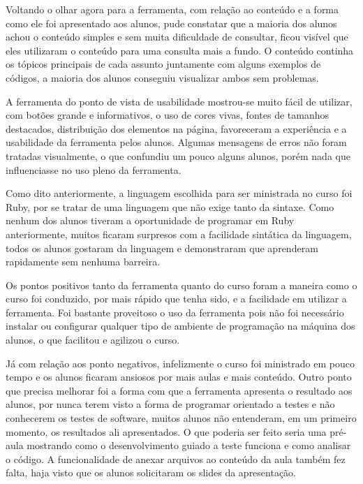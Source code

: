 \documentclass[pnumabnt,normaltoc,espacoumemeio,capchap]{abnt}
\begin{document}
\par Voltando o olhar agora para a ferramenta, com relação ao conteúdo e a forma como ele foi apresentado aos alunos, pude constatar que a maioria dos alunos achou o conteúdo simples e sem muita dificuldade de consultar, ficou visível que eles utilizaram o conteúdo para uma consulta mais a fundo. O conteúdo continha os tópicos principais de cada assunto juntamente com alguns exemplos de códigos, a maioria dos alunos conseguiu visualizar ambos sem problemas.

\par A ferramenta do ponto de vista de usabilidade mostrou-se muito fácil de utilizar, com botões grande e informativos, o uso de cores vivas, fontes de tamanhos destacados, distribuição dos elementos na página, favoreceram a experiência e a usabilidade da ferramenta pelos alunos. Algumas mensagens de erros não foram tratadas visualmente, o que confundiu um pouco alguns alunos, porém nada que influenciasse no uso pleno da ferramenta.

\par Como dito anteriormente, a linguagem escolhida para ser ministrada no curso foi Ruby, por se tratar de uma linguagem que não exige tanto da sintaxe. Como nenhum dos alunos tiveram a oportunidade de programar em Ruby anteriormente, muitos ficaram surpresos com a facilidade sintática da linguagem, todos os alunos gostaram da linguagem e demonstraram que aprenderam rapidamente sem nenhuma barreira.

\par Os pontos positivos tanto da ferramenta quanto do curso foram a maneira como o curso foi conduzido, por mais rápido que tenha sido, e a facilidade em utilizar a ferramenta. Foi bastante proveitoso o uso da ferramenta pois não foi necessário instalar ou configurar qualquer tipo de ambiente de programação na máquina dos alunos, o que facilitou e agilizou o curso.

\par Já com relação aos ponto negativos, infelizmente o curso foi ministrado em pouco tempo e os alunos ficaram ansiosos por mais aulas e mais conteúdo. Outro ponto que precisa melhorar foi a forma com que a ferramenta apresenta o resultado aos alunos, por nunca terem visto a forma de programar orientado a testes e não conhecerem os testes de software, muitos alunos não entenderam, em um primeiro momento, os resultados ali apresentados. O que poderia ser feito seria uma pré-aula mostrando como o desenvolvimento guiado a teste funciona e como analisar o código. A funcionalidade de anexar arquivos ao conteúdo da aula também fez falta, haja visto que os alunos solicitaram os slides da apresentação.
\end{document}
